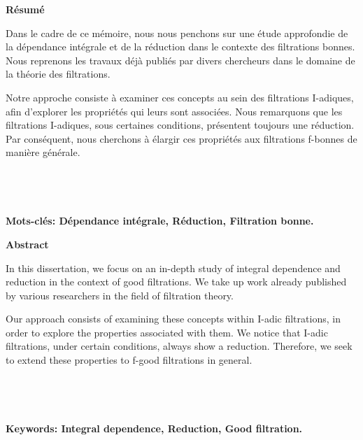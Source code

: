 \newpage
{}
\begin{center}
	\LARGE{\textbf{Résumé}}
\end{center}

Dans le cadre de ce mémoire, nous nous penchons sur une étude approfondie de la dépendance intégrale et de la réduction dans le contexte des filtrations bonnes. Nous reprenons les travaux déjà publiés par divers chercheurs dans le domaine de la théorie des filtrations.

Notre approche consiste à examiner ces concepts au sein des filtrations I-adiques, afin d’explorer les propriétés qui leurs sont associées. Nous remarquons que les filtrations I-adiques, sous certaines conditions, présentent toujours une réduction. Par conséquent, nous cherchons à élargir ces propriétés aux filtrations f-bonnes de manière générale.
\\
\\
\\
\\
\\
\textbf{ Mots-clés: Dépendance intégrale, Réduction, Filtration bonne.} 



\newpage
{}
\begin{center}
	\LARGE{\textbf{Abstract}}
\end{center}

In this dissertation, we focus on an in-depth study of integral dependence and reduction in the context of good filtrations. We take up work already published by various researchers in the field of filtration theory.

Our approach consists of examining these concepts within I-adic filtrations, in order to explore the properties associated with them. We notice that I-adic filtrations, under certain conditions, always show a reduction. Therefore, we seek to extend these properties to f-good filtrations in general.
\\
\\
\\
\\
\\
\textbf{Keywords: Integral dependence, Reduction, Good filtration.} 